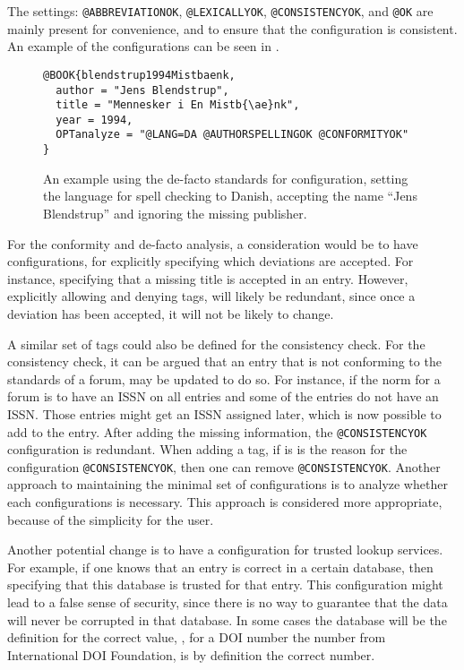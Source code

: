 The settings: \texttt{@ABBREVIATIONOK}, \texttt{@LEXICALLYOK},
\texttt{@CONSISTENCYOK}, and \texttt{@OK} are mainly present for
convenience, and to ensure that the configuration is consistent.  An
example of the configurations can be seen in
.

\begin{figure}
  \centering
\begin{verbatim}
@BOOK{blendstrup1994Mistbaenk,
  author = "Jens Blendstrup",
  title = "Mennesker i En Mistb{\ae}nk",
  year = 1994,
  OPTanalyze = "@LANG=DA @AUTHORSPELLINGOK @CONFORMITYOK"
}
\end{verbatim}
  \caption{An example using the de-facto standards for configuration,
    setting the language for spell checking to Danish, accepting the
    name ``Jens Blendstrup'' and ignoring the missing publisher.}
  \label{fig:analyzing_added_de_facto_standards}
\end{figure}

For the conformity and de-facto analysis, a consideration would be to
have configurations, for explicitly specifying which deviations are
accepted.  For instance, specifying that a missing title is accepted
in an entry.  However, explicitly allowing and denying tags, will
likely be redundant, since once a deviation has been accepted, it will
not be likely to change.

A similar set of tags could also be defined for the consistency check.
For the consistency check, it can be argued that an entry that is not
conforming to the standards of a forum, may be updated to do so.  For
instance, if the norm for a forum is to have an ISSN on all entries
and some of the entries do not have an ISSN.  Those entries might get
an ISSN assigned later, which is now possible to add to the entry.
After adding the missing information, the \texttt{@CONSISTENCYOK}
configuration is redundant.  When adding a tag, if is is the reason
for the configuration \texttt{@CONSISTENCYOK}, then one can remove
\texttt{@CONSISTENCYOK}.  Another approach to maintaining the minimal
set of configurations is to analyze whether each configurations is
necessary.  This approach is considered more appropriate, because of
the simplicity for the user.

Another potential change is to have a configuration for trusted
lookup services.  For example, if one knows that an entry is correct
in a certain database, then specifying that this database is trusted
for that entry.  This configuration might lead to a false sense of
security, since there is no way to guarantee that the data will never
be corrupted in that database.  In some cases the database will be the
definition for the correct value, \eg, for a DOI number the number
from International DOI Foundation, is by definition the correct
number.

